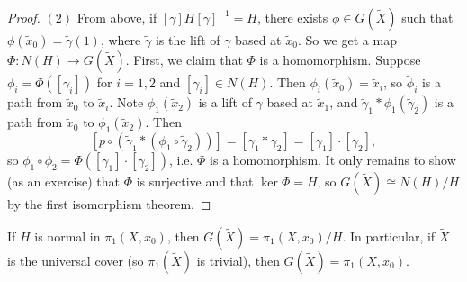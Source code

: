 \begin{proof}
  $(2)$ From above, if $[\gamma] H [\gamma]^{-1} = H$,
  there exists $\phi \in G(\widetilde{X})$ such that
  $\phi(\widetilde{x}_0) = \widetilde{\gamma}(1)$,
  where $\widetilde{\gamma}$ is the lift of $\gamma$
  based at $\widetilde{x}_0$. So we get a map
  $\Phi : N(H) \to G(\widetilde{X})$. First,
  we claim that $\Phi$ is a homomorphism.
  Suppose $\phi_i = \Phi([\gamma_i])$ for
  $i = 1, 2$ and $[\gamma_i] \in N(H)$. Then
  $\phi_i(\widetilde{x}_0) = \widetilde{x}_i$, so
  $\widetilde{\phi}_i$ is a path from
  $\widetilde{x}_0$ to $\widetilde{x}_i$. Note
  $\phi_1(\widetilde{x}_2)$ is a lift
  of $\gamma$ based at $\widetilde{x}_1$, and
  $\widetilde{\gamma}_1 * \phi_{1}(\widetilde{\gamma}_2)$
  is a path from $\widetilde{x}_0$ to $\phi_1(\widetilde{x}_2)$.
  Then
  \[
    [p \circ (\widetilde{\gamma}_1 * (\phi_1 \circ \widetilde{\gamma}_2))]
    = [\gamma_1 * \gamma_2]
    = [\gamma_1] \cdot [\gamma_2],
  \]
  so $\phi_1 \circ \phi_2 = \Phi([\gamma_1] \cdot [\gamma_2])$, i.e.
  $\Phi$ is a homomorphism.
  It only remains to show (as an exercise)
  that $\Phi$ is surjective and that $\ker \Phi = H$,
  so $G(\widetilde{X}) \cong N(H) / H$
  by the first isomorphism theorem.
\end{proof}

\begin{remark}
  If $H$ is normal in $\pi_1(X, x_0)$, then
  $G(\widetilde{X}) = \pi_1(X, x_0) / H$.
  In particular, if $\widetilde{X}$ is the universal
  cover (so $\pi_1(\widetilde{X})$ is trivial), then
  $G(\widetilde{X}) = \pi_1(X, x_0)$.
\end{remark}
